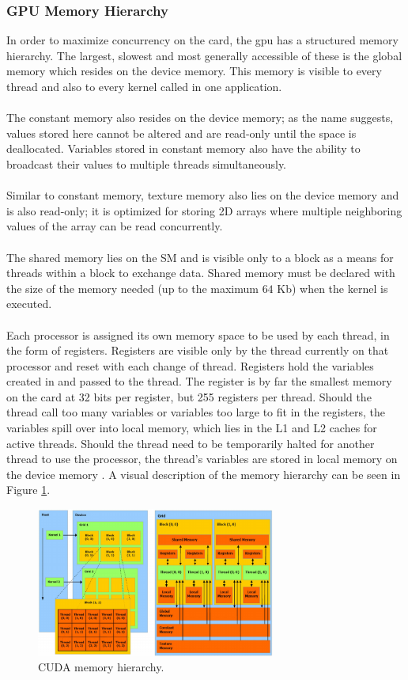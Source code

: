 \subsubsection{GPU Memory Hierarchy}\label{gpu:ssec:mem}
In order to maximize concurrency on the card, the \gls{gpu} has a structured memory hierarchy. The largest, slowest and most generally accessible of these is the global memory which resides on the device memory. This memory is visible to every thread and also to every kernel called in one application. 
\\
\\
The constant memory also resides on the device memory; as the name suggests, values stored here cannot be altered and are read-only until the space is deallocated. Variables stored in constant memory also have the ability to broadcast their values to multiple threads simultaneously.
\\
\\
Similar to constant memory, texture memory also lies on the device memory and is also read-only; it is optimized for storing 2D arrays where multiple neighboring values of the array can be read concurrently.
\\
\\
The shared memory lies on the SM and is visible only to a block as a means for threads within a block to exchange data. Shared memory must be declared with the size of the memory needed (up to the maximum $64$ Kb) when the kernel is executed.
\\
\\
Each processor is assigned its own memory space to be used by each thread, in the form of registers. Registers are visible only by the thread currently on that processor and reset with each change of thread. Registers hold the variables created in and passed to the thread. The register is by far the smallest memory on the card at 32 bits per register, but 255 registers per thread. Should the thread call too many variables or variables too large to fit in the registers, the variables spill over into local memory, which lies in the L1 and L2 caches for active threads. Should the thread need to be temporarily halted for another thread to use the processor, the thread's variables are stored in local memory on the device memory \citep{CUDA}. A visual description of the memory hierarchy can be seen in Figure \ref{gpu:img:mem}.
%
\begin{figure}[H]
\centering
 \includegraphics[width=0.7\textwidth]{Images/Cuda_mem_struct.png}
 \caption[]{CUDA memory hierarchy.\footnotemark}
 \label{gpu:img:mem}
\end{figure}
%
